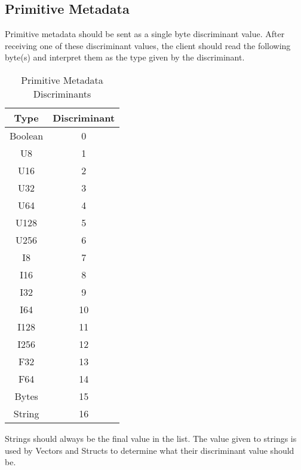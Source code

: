 \documentclass[conference]{IEEEtran}
\begin{document}
\subsection{Primitive Metadata}

Primitive metadata should be sent as a single byte discriminant value. After receiving one of these discriminant values, the client should read the following byte(s) and interpret them as the type given by the discriminant.

\begin{table}[htbp]
	\caption{Primitive Metadata Discriminants}\label{discriminants}
	\begin{center}
		\begin{tabular}{|c|c|}
			\hline
			\textbf{Type} & \textbf{Discriminant} \\
			\hline
			Boolean       & 0                     \\
			U8            & 1                     \\
			U16           & 2                     \\
			U32           & 3                     \\
			U64           & 4                     \\
			U128          & 5                     \\
			U256          & 6                     \\
			I8            & 7                     \\
			I16           & 8                     \\
			I32           & 9                     \\
			I64           & 10                    \\
			I128          & 11                    \\
			I256          & 12                    \\
			F32           & 13                    \\
			F64           & 14                    \\
			Bytes         & 15                    \\
			String        & 16                    \\
			\hline
		\end{tabular}
	\end{center}
\end{table}

Strings should always be the final value in the list. The value given to strings
is used by Vectors and Structs to determine what their discriminant value should
be.
\end{document}
